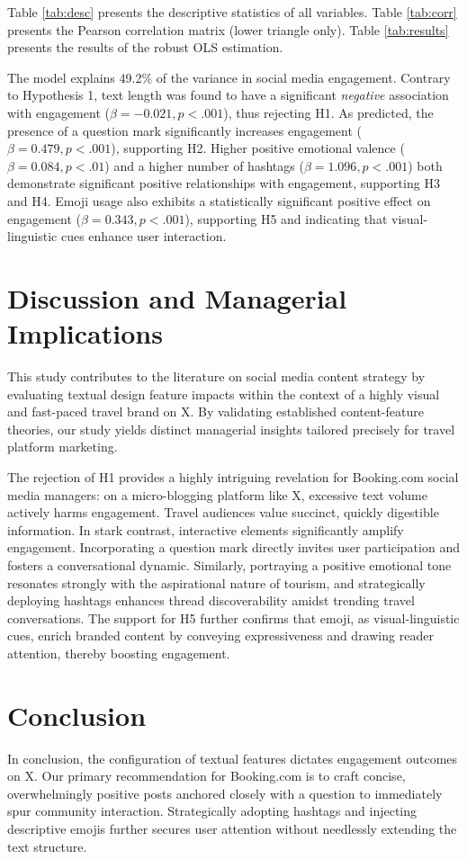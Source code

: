 \documentclass[12pt,a4paper,fontset=none]{ctexart}
\begin{document}
Table \ref{tab:desc} presents the descriptive statistics of all variables. Table \ref{tab:corr} presents the Pearson correlation matrix (lower triangle only). Table \ref{tab:results} presents the results of the robust OLS estimation.

The model explains 49.2\% of the variance in social media engagement. Contrary to Hypothesis 1, text length was found to have a significant \textit{negative} association with engagement ($\beta = -0.021, p < .001$), thus rejecting H1. As predicted, the presence of a question mark significantly increases engagement ($\beta = 0.479, p < .001$), supporting H2. Higher positive emotional valence ($\beta = 0.084, p < .01$) and a higher number of hashtags ($\beta = 1.096, p < .001$) both demonstrate significant positive relationships with engagement, supporting H3 and H4. Emoji usage also exhibits a statistically significant positive effect on engagement ($\beta = 0.343, p < .001$), supporting H5 and indicating that visual-linguistic cues enhance user interaction. 

\section{Discussion and Managerial Implications}
This study contributes to the literature on social media content strategy by evaluating textual design feature impacts within the context of a highly visual and fast-paced travel brand on X. By validating established content-feature theories, our study yields distinct managerial insights tailored precisely for travel platform marketing.

The rejection of H1 provides a highly intriguing revelation for Booking.com social media managers: on a micro-blogging platform like X, excessive text volume actively harms engagement. Travel audiences value succinct, quickly digestible information. In stark contrast, interactive elements significantly amplify engagement. Incorporating a question mark directly invites user participation and fosters a conversational dynamic. Similarly, portraying a positive emotional tone resonates strongly with the aspirational nature of tourism, and strategically deploying hashtags enhances thread discoverability amidst trending travel conversations. The support for H5 further confirms that emoji, as visual-linguistic cues, enrich branded content by conveying expressiveness and drawing reader attention, thereby boosting engagement.

\section{Conclusion}
In conclusion, the configuration of textual features dictates engagement outcomes on X. Our primary recommendation for Booking.com is to craft concise, overwhelmingly positive posts anchored closely with a question to immediately spur community interaction. Strategically adopting hashtags and injecting descriptive emojis further secures user attention without needlessly extending the text structure.
\end{document}
